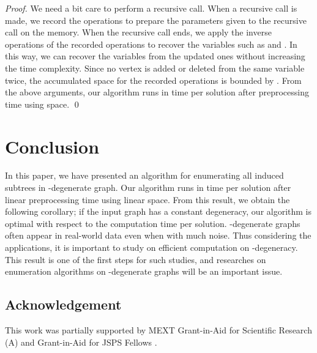 \documentclass{llncs}
\begin{document}
\begin{proof}
    We need a bit care to perform a recursive call. 
    When a recursive call is made, 
    we record the operations 
    to prepare the parameters given to the recursive call on the memory. 
    When the recursive call ends, 
    we apply the inverse operations of the recorded operations 
    to recover the variables such as  and . 
    In this way, 
    we can recover the variables from the updated ones 
    without increasing the time complexity. 
    Since no vertex is added or deleted from the same variable twice, 
    the accumulated space for the recorded operations is bounded by . 
From the above arguments, 
    our algorithm runs in  time per solution 
    after  preprocessing time using  space. 
    \qed
\end{proof}



\section{Conclusion}
\label{sec:conc}

In this paper, 
we have presented an algorithm for enumerating all induced subtrees in -degenerate graph. 
Our algorithm runs in  time per solution after linear preprocessing time 
using linear space. 
From this result, 
we obtain the following corollary; 
if the input graph has a constant degeneracy, 
our algorithm is optimal with respect to the computation time per solution. 
-degenerate graphs often appear in real-world data 
even when with much noise. 
Thus considering the applications, 
it is important to study on efficient computation on -degeneracy. 
This result is one of the first steps for such studies, 
and researches on enumeration algorithms on -degenerate graphs will be an important issue. 




\subsection*{Acknowledgement}
This work was partially supported by 
MEXT Grant-in-Aid for Scientific Research (A)  
and Grant-in-Aid for JSPS Fellows . 
\end{document}

